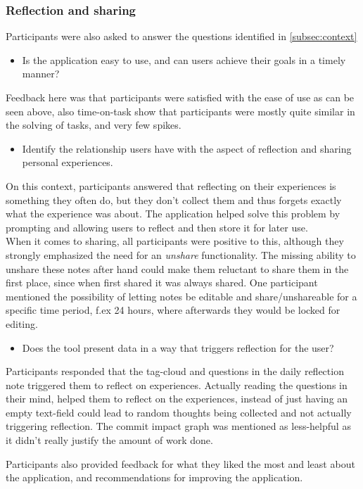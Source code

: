 \subsubsection{Reflection and sharing}
\label{subsubsec:reflection}
Participants were also asked to answer the questions identified in \ref{subsec:context}
\begin{itemize}
	\item Is the application easy to use, and can users achieve their goals in a timely manner?
\end{itemize}
Feedback here was that participants were satisfied with the ease of use as can be seen above, also time-on-task show that participants were mostly quite similar in the solving of tasks, and very few spikes. 
\begin{itemize}
	\item Identify the relationship users have with the aspect of reflection and sharing personal experiences.
\end{itemize}
On this context, participants answered that reflecting on their experiences is something they often do, but they don't collect them and thus forgets exactly what the experience was about. The application helped solve this problem by prompting and allowing users to reflect and then store it for later use. \\
When it comes to sharing, all participants were positive to this, although they strongly emphasized the need for an \emph{unshare} functionality. The missing ability to unshare these notes after hand could make them reluctant to share them in the first place, since when first shared it was always shared. One participant mentioned the possibility of letting notes be editable and share/unshareable for a specific time period, f.ex 24 hours, where afterwards they would be locked for editing.  
\begin{itemize}
	\item Does the tool present data in a way that triggers reflection for the user?
\end{itemize}
Participants responded that the tag-cloud and questions in the daily reflection note triggered them to reflect on experiences. Actually reading the questions in their mind, helped them to reflect on the experiences, instead of just having an empty text-field could lead to random thoughts being collected and not actually triggering reflection. The commit impact graph was mentioned as less-helpful as it didn't really justify the amount of work done. 
	
Participants also provided feedback for what they liked the most and least about the application, and recommendations for improving the application. \\
